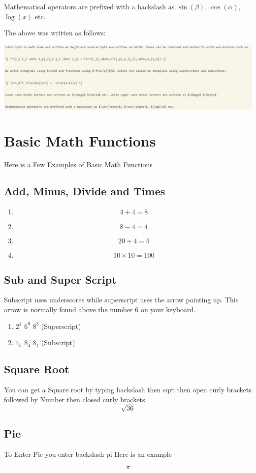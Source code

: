 \documentclass[12pt,a4paper,landscape]{article}
\begin{document}
\begin{flushleft}
Mathematical operators are prefixed with a backslash as $\sin(\beta)$, $\cos(\alpha)$, $\log(x)$ etc.

The above was written as follows:

\includegraphics[scale=0.4]{Math Example Bits and Bobs.PNG} 
 



\section{Basic Math Functions}
Here is a Few Examples of Basic Math Functions

\subsection{Add, Minus, Divide and Times}
\begin{enumerate}
    \item $$4+4=8$$
    \item $$8-4=4$$
    \item $$20\div4=5$$
    \item $$10\times10=100$$
\end{enumerate}
\subsection{Sub and Super Script}

Subscript uses underscores while superscript uses the arrow pointing up. This arrow is normally found above the number 6 on your keyboard. 

\begin{enumerate}
    \item $2^4$ $6^9$ $8^3$ (Superscript)
    \item $4_5$ $8_4$ $8_1$ (Subscript)
\end{enumerate}
\subsection{Square Root}
You can get a Square root by typing backslash then sqrt then open curly brackets followed by Number then closed curly brackets. 
$$\sqrt{36}$$
\subsection{Pie}
To Enter Pie you enter backslash pi 
Here is an example

$$\pi$$
\end{flushleft}
\end{document}

